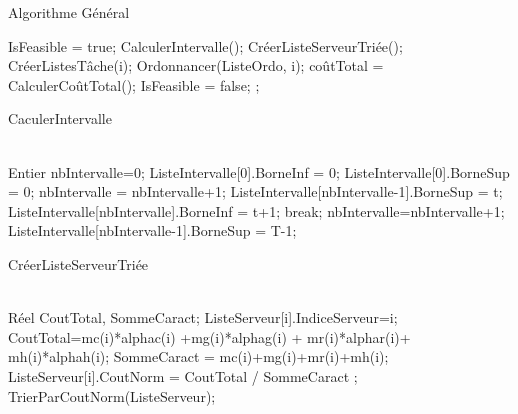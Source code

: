 \begin{algorithm}[H]
\caption{Algorithme Général}
\label{algo0}
\begin{algorithmic}[1]
\LOOP
\STATE IsFeasible = true;
\STATE CalculerIntervalle();
\STATE CréerListeServeurTriée();
		\STATE CréerListesTâche(i);
		\STATE Ordonnancer(ListeOrdo, i);
	\ENDFOR
\STATE	
{}
\STATE coûtTotal = CalculerCoûtTotal();
\STATE
{}
			\STATE IsFeasible = false;
			\RETURN;
			\ENDIF
		\ENDFOR
	\ENDFOR
\ENDLOOP
\end{algorithmic}
\end{algorithm} 


\begin{algorithm}[H]
\caption{CaculerIntervalle}
\label{algo1}
\begin{algorithmic}[1]
\\
\LOOP
\STATE Entier nbIntervalle=0;
\STATE ListeIntervalle[0].BorneInf = 0;
\STATE ListeIntervalle[0].BorneSup = 0;
				\STATE nbIntervalle = nbIntervalle+1;
				\STATE ListeIntervalle[nbIntervalle-1].BorneSup = t;
				\STATE ListeIntervalle[nbIntervalle].BorneInf = t+1; 
				\STATE break;
			\ENDIF
		\ENDFOR
	\ENDFOR
	\STATE nbIntervalle=nbIntervalle+1;
	\STATE ListeIntervalle[nbIntervalle-1].BorneSup = T-1;
\ENDLOOP
\end{algorithmic}
\end{algorithm} 


\begin{algorithm}[H]
\caption{CréerListeServeurTriée}
\label{algo2}
\begin{algorithmic}[1]
\\
\LOOP
	\STATE Réel CoutTotal, SommeCaract;
		\STATE ListeServeur[i].IndiceServeur=i;
		\STATE CoutTotal=mc(i)*alphac(i) +mg(i)*alphag(i) + mr(i)*alphar(i)+ mh(i)*alphah(i);
		\STATE SommeCaract = mc(i)+mg(i)+mr(i)+mh(i);
		\STATE ListeServeur[i].CoutNorm = CoutTotal / SommeCaract ;
	\ENDFOR
	\STATE TrierParCoutNorm(ListeServeur);
\ENDLOOP
\end{algorithmic}
\end{algorithm}



